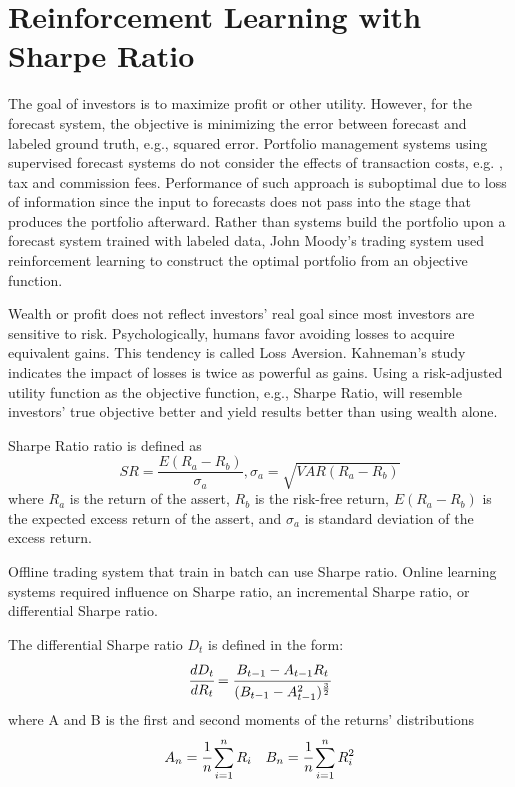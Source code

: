 \section{Reinforcement Learning with Sharpe Ratio}
The goal of investors is to maximize profit or other utility. However, for the forecast system, the objective is minimizing the error between forecast and labeled ground truth, e.g., squared error. Portfolio management systems using supervised forecast systems do not consider the effects of transaction costs, e.g. , tax and commission fees. Performance of such approach is suboptimal due to loss of information since the input to forecasts does not pass into the stage that produces the portfolio afterward.
Rather than systems build the portfolio upon a forecast system trained with labeled data, John Moody's trading system used reinforcement learning to construct the optimal portfolio from an objective function\cite{618952,moody1998performance}.
\par
Wealth or profit does not reflect investors' real goal since most investors are sensitive to risk. Psychologically, humans favor avoiding losses to acquire equivalent gains. This tendency is called Loss Aversion.\cite{kahneman2000analysis} Kahneman's study indicates the impact of losses is twice as powerful as gains\cite{Tversky1992}. Using a risk-adjusted utility function as the objective function, e.g., Sharpe Ratio, will resemble investors' true objective better and yield results better than using wealth alone.
\par
Sharpe Ratio ratio is defined as 
\[ SR = \frac{E(R_a - R_b)}{\sigma_a},
\sigma_a = \sqrt{VAR(R_a-R_b)}\]
where \(R_a\) is the return of the assert, 
\(R_b\) is the risk-free return,
\(E(R_a - R_b)\) is the expected excess return of the assert,
and \(\sigma_a\) is standard deviation of the excess return.
\par
Offline trading system that train in batch can use Sharpe ratio. 
Online learning systems required influence on Sharpe ratio, an incremental Sharpe ratio, or differential Sharpe ratio.

The differential Sharpe ratio \(D_t\) is defined in the form:
\[
\cfrac{d D_t}{d R_t} = 
\cfrac{B_{t-1}-A_{t-1} R_t}{(B_{t-1}-A_{t-1}^2)^\frac{3}{2}}
\]
where
A and B is the first and second moments of the returns' distributions
\[ A_n = \cfrac{1}{n}\sum_{i=1}^nR_i\quad
B_n = \cfrac{1}{n}\sum_{i=1}^nR_i^2
\]